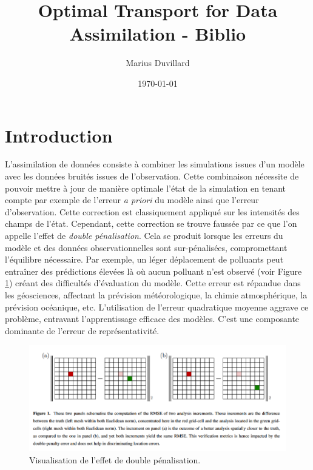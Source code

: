 \documentclass{article}
\begin{document}
\title{Optimal Transport for Data Assimilation - Biblio}
\author{Marius Duvillard}
\date{\today}
\maketitle

\tableofcontents

\section{Introduction}

L'assimilation de données consiste à combiner les simulations issues d'un modèle avec les données bruités issues de l'observation. Cette combinaison nécessite de pouvoir mettre à jour de manière optimale l'état de la simulation en tenant compte par exemple de l'erreur \textit{a priori} du modèle ainsi que l'erreur d'observation.
Cette correction est classiquement appliqué sur les intensités des champs de l'état. Cependant, cette correction se trouve faussée par ce que l'on appelle l'effet de \textit{double pénalisation}.
Cela se produit lorsque les erreurs du modèle et des données observationnelles sont sur-pénalisées, compromettant l'équilibre nécessaire. Par exemple, un léger déplacement de polluants peut entraîner des prédictions élevées là où aucun polluant n'est observé (voir Figure \ref{fig:double_penalization_error}) créant des difficultés d'évaluation du modèle. Cette erreur est répandue dans les géosciences, affectant la prévision météorologique, la chimie atmosphérique, la prévision océanique, etc. L'utilisation de l'erreur quadratique moyenne aggrave ce problème, entravant l'apprentissage efficace des modèles. C'est une composante dominante de l'erreur de représentativité.

\begin{figure}[h]
    \centering
    \includegraphics[width=\linewidth]{double_penalization_error.png}
    \caption{Visualisation de l'effet de double pénalisation.}
    \label{fig:double_penalization_error}
\end{figure}
\end{document}
